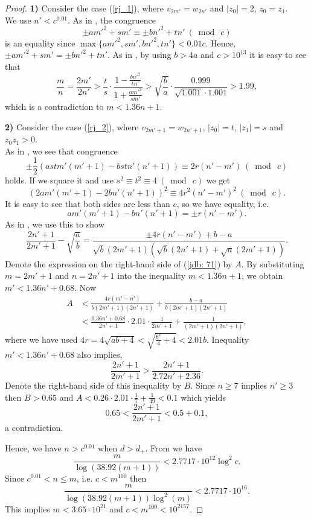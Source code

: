 \documentclass[12pt]{amsart}%
\theoremstyle{definition}
\theoremstyle{remark}
\theoremstyle{plain}
\begin{document}
\begin{proof}
    
    \textbf{1)} Consider the case (\ref{rj_1}), where $v_{2m'}=w_{2n'}$  and $|z_0|=2$, $z_0=z_1$. \\
    We use $n'<c^{0.01}$.
As in \cite[Lemma 13]{fil_xy4}, the congruence 
$$\pm am'^2+sm'\equiv \pm bn'^2+tn'\ (\bmod \ c)$$
is an equality since $\max\{am'^2,sm',bn'^2,tn'\}<0.01c$. Hence, $\pm am'^2+sm'= \pm bn'^2+tn'.$
As in \cite[Lemma 11]{duje_kon}, by using $b>4a$ and $c>10^{13}$ it is easy to see that 
$$\frac{m}{n}=\frac{2m'}{2n'}>\frac{t}{s}\cdot \frac{1-\frac{bn'^2}{tn'}}{1+\frac{am'^2}{sm'}}>\sqrt{\frac{b}{a}}\cdot\frac{0.999}{\sqrt{1.001}\cdot1.001}>1.99,$$
which is a contradiction to $m<1.36n+1$.
   \par \textbf{2)} Consider the case (\ref{rj_2}), where $v_{2m'+1}=w_{2n'+1}$, $|z_0|=t$, $|z_1|=s$ and $z_0z_1>0$.\\
   As in \cite[Lemma 13]{fil_xy4}, we see that congruence 
   $$\pm \frac{1}{2}(astm'(m'+1)-bstn'(n'+1))\equiv 2r(n'-m')\ (\bmod \ c)$$
   holds. If we square it and use $s^2\equiv t^2\equiv 4\ (\bmod \ c)$ we get
   $$(2am'(m'+1)-2bn'(n'+1))^2\equiv 4r^2(n'-m')^2\ (\bmod \ c).$$
   It is easy to see that both sides are less than $c$, so we have equality, i.e.
   $$am'(m'+1)-bn'(n'+1)= \pm r(n'-m').$$
   As in \cite[Lemma 11]{duje_kon}, we use this to show
   \begin{equation}\label{jdb: 71}
   \frac{2n'+1}{2m'+1}-\sqrt{\frac{a}{b}}=\frac{\pm 4r(n'-m')+b-a}{\sqrt{b}(2m'+1)(\sqrt{b}(2n'+1)+\sqrt{a}(2m'+1))}.
   \end{equation}
   Denote the expression on the right-hand side of (\ref{jdb: 71}) by $A$. By substituting $m=2m'+1$ and $n=2n'+1$ into the inequality $m<1.36n+1$, we obtain $m'<1.36n'+0.68$. Now
   \begin{align*}
   A& <\frac{4r(m'-n')}{b(2m'+1)(2n'+1)}+\frac{b-a}{b(2m'+1)(2n'+1)} \\
   &<\frac{0.36n'+0.68}{2n'+1}\cdot 2.01\cdot \frac{1}{2m'+1}+\frac{1}{(2m'+1)(2n'+1)},
   \end{align*}
   where we have used $4r=4\sqrt{ab+4}<\sqrt{\frac{b^2}{4}+4}<2.01b$. 
      Inequality $m'<1.36n'+0.68$ also implies,
   $$\frac{2n'+1}{2m'+1}>\frac{2n'+1}{2.72n'+2.36}.$$
   Denote the right-hand side of this inequality by $B$. Since $n\geq 7$ implies $n'\geq 3$ then $B>0.65$ and $A<0.26\cdot 2.01\cdot \frac{1}{7}+\frac{1}{49}<0.1$ which yields $$0.65<\frac{2n'+1}{2m'+1}<0.5+0.1,$$
   a contradiction.

   Hence, we have $n>c^{0.01}$ when $d>d_+$. From \cite[Proposition 5.4]{mbt} we have
\begin{equation}\label{njb_log_m}
\frac{m}{\log(38.92(m+1))}<2.7717\cdot10^{12}\log^2c.
\end{equation}
Since $c^{0.01}<n\leq m$, i.e. $c<m^{100}$ then
$$\frac{m}{\log(38.92(m+1))\log^2(m)}<2.7717\cdot10^{16}.$$
This implies $m<3.65\cdot 10^{21}$ and $c<m^{100}<10^{2157}$.
\end{proof}
\end{document}
